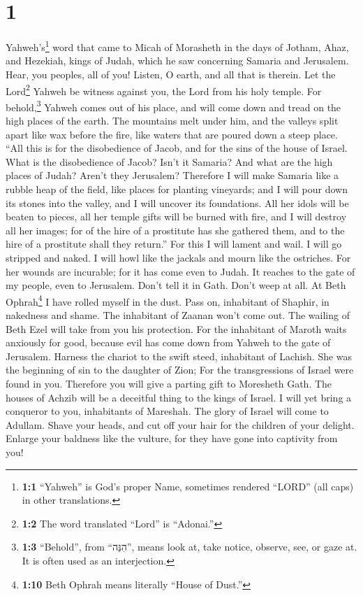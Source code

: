 \hypertarget{section}{%
\section{1}\label{section}}

 Yahweh's\footnote{\textbf{1:1} ``Yahweh'' is God's proper
  Name, sometimes rendered ``LORD'' (all caps) in other translations.}
word that came to Micah of Morasheth in the days of Jotham, Ahaz, and
Hezekiah, kings of Judah, which he saw concerning Samaria and Jerusalem.
 Hear, you peoples, all of you! Listen, O earth, and all
that is therein. Let the Lord\footnote{\textbf{1:2} The word translated
  ``Lord'' is ``Adonai.''} Yahweh be witness against you, the Lord from
his holy temple.  For behold,\footnote{\textbf{1:3}
  ``Behold'', from ``הִנֵּה'', means look at, take notice, observe, see,
  or gaze at. It is often used as an interjection.} Yahweh comes out of
his place, and will come down and tread on the high places of the earth.
 The mountains melt under him, and the valleys split apart
like wax before the fire, like waters that are poured down a steep
place.  ``All this is for the disobedience of Jacob, and
for the sins of the house of Israel. What is the disobedience of Jacob?
Isn't it Samaria? And what are the high places of Judah? Aren't they
Jerusalem?  Therefore I will make Samaria like a rubble
heap of the field, like places for planting vineyards; and I will pour
down its stones into the valley, and I will uncover its foundations.
 All her idols will be beaten to pieces, all her temple
gifts will be burned with fire, and I will destroy all her images; for
of the hire of a prostitute has she gathered them, and to the hire of a
prostitute shall they return.''  For this I will lament
and wail. I will go stripped and naked. I will howl like the jackals and
mourn like the ostriches.  For her wounds are incurable;
for it has come even to Judah. It reaches to the gate of my people, even
to Jerusalem.  Don't tell it in Gath. Don't weep at all.
At Beth Ophrah\footnote{\textbf{1:10} Beth Ophrah means literally
  ``House of Dust.''} I have rolled myself in the dust. 
Pass on, inhabitant of Shaphir, in nakedness and shame. The inhabitant
of Zaanan won't come out. The wailing of Beth Ezel will take from you
his protection.  For the inhabitant of Maroth waits
anxiously for good, because evil has come down from Yahweh to the gate
of Jerusalem.  Harness the chariot to the swift steed,
inhabitant of Lachish. She was the beginning of sin to the daughter of
Zion; For the transgressions of Israel were found in you.
 Therefore you will give a parting gift to Moresheth
Gath. The houses of Achzib will be a deceitful thing to the kings of
Israel.  I will yet bring a conqueror to you, inhabitants
of Mareshah. The glory of Israel will come to Adullam. 
Shave your heads, and cut off your hair for the children of your
delight. Enlarge your baldness like the vulture, for they have gone into
captivity from you!

